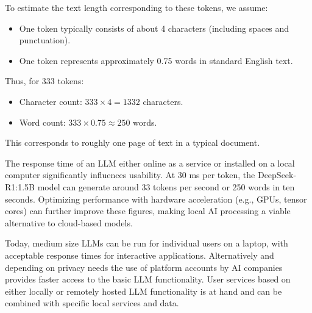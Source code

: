 To estimate the text length corresponding to these tokens, we assume:
\begin{itemize}
    \item One token typically consists of about 4 characters (including spaces and punctuation).
    \item One token represents approximately 0.75 words in standard English text.
\end{itemize}
Thus, for 333 tokens:
\begin{itemize}
    \item Character count: \( 333 \times 4 = 1332 \) characters.
    \item Word count: \( 333 \times 0.75 \approx 250 \) words.
\end{itemize}
This corresponds to roughly one page of text in a typical document.

The response time of an LLM either online as a service or installed on a local computer significantly influences usability. At 30 ms per token, the DeepSeek-R1:1.5B model can generate around 33 tokens per second or 250 words in ten seconds. Optimizing performance with hardware acceleration (e.g., GPUs, tensor cores) can further improve these figures, making local AI processing a viable alternative to cloud-based models.

\begin{recommendationbox}
Today, medium size LLMs can be run for individual users on a laptop, with acceptable response times for interactive applications. Alternatively and depending on privacy needs the use of platform accounts by AI companies provides faster access to the basic LLM functionality. User services based on either locally or remotely hosted LLM functionality is at hand and can be combined with specific local services and data. 
\end{recommendationbox}
